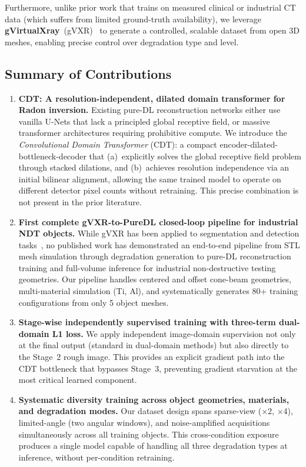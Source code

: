 \documentclass[10pt,twocolumn]{article}
\begin{document}
Furthermore, unlike prior work that trains on measured clinical or
industrial CT data (which suffers from limited ground-truth
availability), we leverage \textbf{gVirtualXray}~(gVXR)~\cite{vidal2019gvxr}
to generate a controlled, scalable dataset from open 3D meshes,
enabling precise control over degradation type and level.

\subsection{Summary of Contributions}

\begin{enumerate}[leftmargin=*, label=\textbf{\arabic*.}]
    \item \textbf{CDT: A resolution-independent, dilated domain transformer
    for Radon inversion.}
    Existing pure-DL reconstruction networks either use vanilla U-Nets
    that lack a principled global receptive field, or massive
    transformer architectures requiring prohibitive compute.
    We introduce the \textit{Convolutional Domain Transformer} (CDT):
    a compact encoder-dilated-bottleneck-decoder that (a)~explicitly
    solves the global receptive field problem through stacked
    dilations, and (b)~achieves resolution independence via an
    initial bilinear alignment, allowing the same trained model to
    operate on different detector pixel counts without retraining.
    This precise combination is not present in the prior literature.

    \item \textbf{First complete gVXR-to-PureDL closed-loop
    pipeline for industrial NDT objects.}
    While gVXR has been applied to segmentation and
    detection tasks~\cite{vidal2019gvxr}, no published work has
    demonstrated an end-to-end pipeline from STL mesh simulation
    through degradation generation to pure-DL reconstruction training
    and full-volume inference for industrial non-destructive testing
    geometries.
    Our pipeline handles centered and offset cone-beam geometries,
    multi-material simulation (Ti, Al), and systematically generates
    80+ training configurations from only 5 object meshes.

    \item \textbf{Stage-wise independently supervised training
    with three-term dual-domain L1 loss.}
    We apply independent image-domain supervision not only at the
    final output (standard in dual-domain methods) but also directly
    to the Stage~2 rough image.
    This provides an explicit gradient path into the CDT bottleneck
    that bypasses Stage~3, preventing gradient starvation at the
    most critical learned component.

    \item \textbf{Systematic diversity training across object
    geometries, materials, and degradation modes.}
    Our dataset design spans sparse-view ($\times$2, $\times$4),
    limited-angle (two angular windows), and noise-amplified
    acquisitions simultaneously across all training objects.
    This cross-condition exposure produces a single model capable
    of handling all three degradation types at inference,
    without per-condition retraining.
\end{enumerate}
\end{document}
